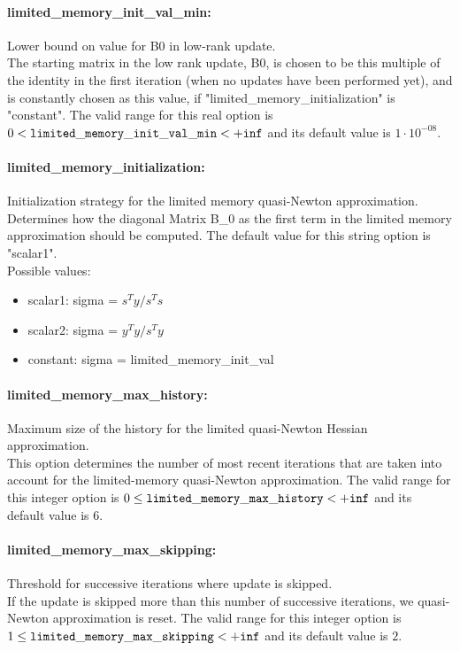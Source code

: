 \paragraph{limited\_memory\_init\_val\_min:}\label{sec:limited_memory_init_val_min} Lower bound on value for B0 in low-rank update. $\;$ \\
 The starting matrix in the low rank update, B0,
is chosen to be this multiple of the identity in
the first iteration (when no updates have been
performed yet), and is constantly chosen as this
value, if "limited\_memory\_initializat\-ion" is
"constant". The valid range for this real option is 
$0 <  {\tt limited\_memory\_init\_val\_min } <  {\tt +inf}$
and its default value is $1 \cdot 10^{-08}$.


\paragraph{limited\_memory\_initialization:}\label{sec:limited_memory_initialization} Initialization strategy for the limited memory quasi-Newton approximation. $\;$ \\
 Determines how the diagonal Matrix B\_0 as the
first term in the limited memory approximation
should be computed.
The default value for this string option is "scalar1".
\\ 
Possible values:
\begin{itemize}
   \item scalar1: sigma = $s^Ty/s^Ts$
   \item scalar2: sigma = $y^Ty/s^Ty$
   \item constant: sigma = limited\_memory\_init\_val
\end{itemize}

\paragraph{limited\_memory\_max\_history:}\label{sec:limited_memory_max_history} Maximum size of the history for the limited quasi-Newton Hessian approximation. $\;$ \\
 This option determines the number of most recent
iterations that are taken into account for the
limited-memory quasi-Newton approximation. The valid range for this integer option is
$0 \le {\tt limited\_memory\_max\_history } <  {\tt +inf}$
and its default value is $6$.


\paragraph{limited\_memory\_max\_skipping:}\label{sec:limited_memory_max_skipping} Threshold for successive iterations where update is skipped. $\;$ \\
 If the update is skipped more than this number of
successive iterations, we quasi-Newton
approximation is reset. The valid range for this integer option is
$1 \le {\tt limited\_memory\_max\_skipping } <  {\tt +inf}$
and its default value is $2$.


